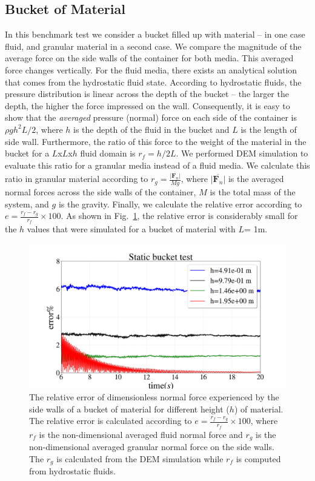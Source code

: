 \subsection{Bucket of Material}
In this benchmark test we consider a bucket filled up with material -- in one case fluid, and granular material in a second case. We compare the magnitude of the average force on the side walls of the container for both media. This averaged force changes vertically. For the fluid media, there exists an analytical solution that comes from the hydrostatic fluid state. According to hydrostatic fluids, the pressure distribution is linear across the depth of the bucket -- the larger the depth, the higher the force impressed on the wall. Consequently, it is easy to show that the \textit{averaged} pressure (normal) force on each side of the container is $ \rho g h^2 L /2 $, where $h$ is the depth of the fluid in the bucket and $L$ is the length of side wall.  Furthermore, the ratio of this force to the weight of the material in the bucket for a $L$x$L$x$h$ fluid domain is $r_f=h/2L$. We performed DEM simulation to evaluate this ratio for a granular media instead of a fluid media. We calculate this ratio in granular material according to $r_g=\frac{\overline{|\textbf{F}_n|}}{Mg}$, where  $\overline{|\textbf{F}_n|}$ is the averaged normal forces across the side walls of the container, $M$ is the total mass of the system, and $g$ is the gravity. Finally, we calculate the relative error according to $e=\frac{r_f-r_g}{r_f}\times 100$. As shown in Fig.~\ref{fig:bucket}, the relative error is considerably small for the $h$ values that were simulated for a bucket of material with $L$= 1\si{m}.
\begin{figure}[H]
	\begin{center}
		\includegraphics[width=.8\textwidth]{images/CFD_DEM/Figure_Bucket.png}
	\end{center}
	\caption{The relative error of dimensionless normal force  experienced by the side walls of a bucket of material for different height ($h$) of material. The relative error is calculated according to $e=\frac{r_f-r_g}{r_f}\times 100$, where $r_f$ is the non-dimensional averaged fluid normal force and $r_g$ is the non-dimensional averaged granular normal force on the side walls. The $r_g$ is calculated from the DEM simulation while $r_f$ is computed from hydrostatic fluids.}
	\label{fig:bucket}
\end{figure}

